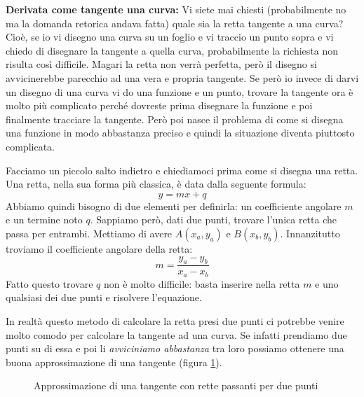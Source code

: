 \textbf{Derivata come tangente una curva:} Vi siete mai chiesti (probabilmente 
no ma la domanda retorica andava fatta) quale sia la retta tangente a una 
curva? Cioè, se io vi disegno una curva su un foglio e vi traccio un punto 
sopra e vi chiedo di disegnare la tangente a quella curva, probabilmente la 
richiesta non risulta così difficile. Magari la retta non verrà perfetta, però 
il disegno si avvicinerebbe parecchio ad una vera e propria tangente. Se però 
io invece di darvi un disegno di una curva vi do una funzione e un punto, 
trovare la tangente ora è molto più complicato perché dovreste prima disegnare 
la funzione e poi finalmente tracciare la tangente. Però poi nasce il problema 
di come si disegna una funzione in modo abbastanza preciso e quindi la 
situazione diventa piuttosto complicata. 

Facciamo un piccolo salto indietro e chiediamoci prima come si disegna una 
retta. Una retta, nella sua forma più classica, è data dalla seguente formula:
\begin{equation*}
	y = mx + q
\end{equation*}
Abbiamo quindi bisogno di due elementi per definirla: un coefficiente angolare 
$m$ e un termine noto $q$. Sappiamo però, dati due punti, trovare l'unica retta 
che passa per entrambi. Mettiamo di avere $A(x_a, y_a)$ e $B(x_b, y_b)$. 
Innanzitutto troviamo il coefficiente angolare della retta:
\begin{equation*}
	m = \dfrac{y_a - y_b}{x_a - x_b}
\end{equation*}
Fatto questo trovare $q$ non è molto difficile: basta inserire nella retta $m$ 
e uno qualsiasi dei due punti e risolvere l'equazione.

In realtà questo metodo di calcolare la retta presi due punti ci potrebbe 
venire molto comodo per calcolare la tangente ad una curva. Se infatti 
prendiamo due punti su di essa e poi li \textit{avviciniamo abbastanza} tra 
loro possiamo ottenere una buona approssimazione di una tangente (figura 
\ref{fig_approxTangenteCurva}).

\begin{figure}[h]
\centering
{}
  \caption{Approssimazione di una tangente con rette passanti per due punti} 
	\label{fig_approxTangenteCurva}
\end{figure}

